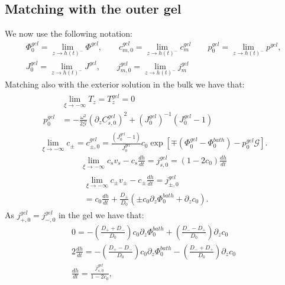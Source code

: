 \documentclass[12pt]{extarticle}
\begin{document}
\subsection{Matching with the outer gel}
We now use the following notation:
\begin{equation}
\begin{aligned}
\Phi^{gel}_0=\lim_{z\rightarrow h(t)^-} \Phi^{gel}, \qquad c^{gel}_{m,0}=\lim_{z\rightarrow h(t)^-} c^{gel}_{m} \qquad p_0^{gel}=\lim_{z\rightarrow h(t)^-} p^{gel},\\
J^{gel}_0=\lim_{z\rightarrow h(t)^-} J^{gel}, \qquad j^{gel}_{m,0}=\lim_{z\rightarrow h(t)^-} j^{gel}_m
\end{aligned}
\end{equation}
Matching also with the exterior solution in the bulk we have that:
\begin{gather}
\begin{aligned}
&\lim_{\xi\rightarrow -\infty} T_z = T^{gel}_z =0 \\
p^{gel}_0& = -\frac{\omega^2 }{2\mathcal{G}} (\partial_z C^{gel}_{s,0})^2+ (J^{gel}_0)^{-1}\left(J^{gel}_0-1\right)\label{eq1}
\end{aligned}\\
\lim_{\xi\rightarrow -\infty} c_\pm = c^{gel}_{\pm,0} = \frac{(J^{gel}_0-1)}{J^{gel}_0}c_0\exp[\mp(\Phi^{gel}_0-\Phi_0^{bath})-p_0^{gel}\mathcal{G}].
\end{gather}
\begin{gather}
\lim_{\xi\rightarrow -\infty} c_s v_s - c_s \frac{dh}{dt}= j^{gel}_{s,0} =(1-2c_0)\frac{dh}{dt}\\
\begin{aligned}
\lim_{\xi\rightarrow -\infty}c_\pm v_\pm - c_\pm \frac{dh}{dt}=j^{gel}_{\pm,0}\\
=c_0 \frac{dh}{dt}  +\frac{D_\pm}{D_0}\left(\pm c_0 \partial_z \Phi^{bath}_0+\partial_z c_0\right).
\end{aligned}
\end{gather}
As $j^{gel}_{+,0}=j^{gel}_{-,0}$ in the gel we have that:
\begin{eqnarray}
0= - \left(\frac{D_++D_-}{D_0}\right)c_0\partial_z \Phi^{bath}_0 + \left(\frac{D_--D_+}{D_0}\right)\partial_z c_0\label{A}\\
2 \frac{d h}{dt} =- \left(\frac{D_+-D_-}{D_0}\right)c_0\partial_z \Phi^{bath}_0 - \left(\frac{D_-+D_+}{D_0}\right)\partial_z c_0\label{B}\\
\frac{d h}{dt} = \frac{j_{s,0}^{gel}}{1-2c_0},
\end{eqnarray}
\end{document}
